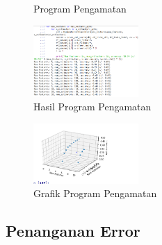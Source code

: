 \begin{enumerate}
\begin{figure}[H]
                \centering
                \caption{Program Pengamatan}
                \end{figure}
            \begin{figure}[H]
                \includegraphics[width=4cm]{figures/1174040/chapter3/22.png}
                \centering
                \caption{Hasil Program Pengamatan}
                \end{figure}
            \begin{figure}[H]
                \includegraphics[width=4cm]{figures/1174040/chapter3/matplot.png}
                \centering
                \caption{Grafik Program Pengamatan}
                \end{figure}
        \end{enumerate}
    \subsection{Penanganan Error}
